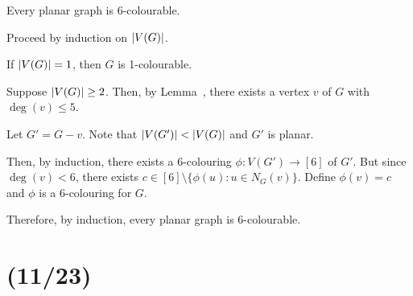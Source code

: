 \documentclass[class=math239,notes,tikz]{agony}
\begin{document}
\begin{theorem}
  Every planar graph is 6-colourable.
\end{theorem}
\begin{prf}
  Proceed by induction on $\abs{V(G)}$.

  If $\abs{V(G)} = 1$, then $G$ is 1-colourable.

  Suppose $\abs{V(G)} \geq 2$.
  Then, by Lemma~,
  there exists a vertex $v$ of $G$ with $\deg(v) \leq 5$.

  Let $G' = G-v$. Note that $\abs{V(G')} < \abs{V(G)}$ and $G'$ is planar.

  Then, by induction, there exists a 6-colouring $\phi : V(G') \to [6]$ of $G'$.
  But since $\deg(v) < 6$, there exists
  $c \in [6] \setminus \{\phi(u) : u \in N_G(v)\}$.
  Define $\phi(v) = c$ and $\phi$ is a 6-colouring for $G$.

  Therefore, by induction, every planar graph is 6-colourable.
\end{prf}

\section{(11/23)}
\end{document}
